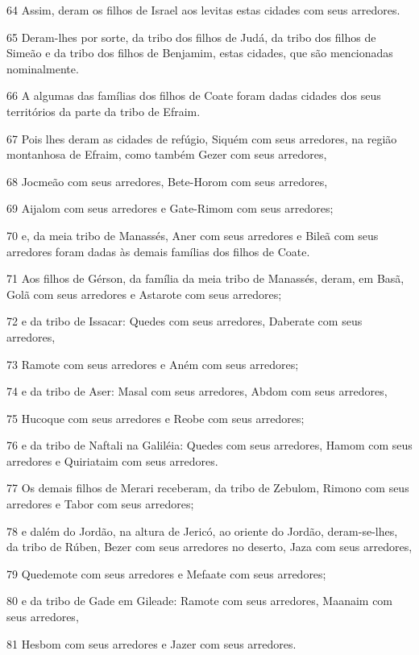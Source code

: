 \par 64 Assim, deram os filhos de Israel aos levitas estas cidades com seus arredores.
\par 65 Deram-lhes por sorte, da tribo dos filhos de Judá, da tribo dos filhos de Simeão e da tribo dos filhos de Benjamim, estas cidades, que são mencionadas nominalmente.
\par 66 A algumas das famílias dos filhos de Coate foram dadas cidades dos seus territórios da parte da tribo de Efraim.
\par 67 Pois lhes deram as cidades de refúgio, Siquém com seus arredores, na região montanhosa de Efraim, como também Gezer com seus arredores,
\par 68 Jocmeão com seus arredores, Bete-Horom com seus arredores,
\par 69 Aijalom com seus arredores e Gate-Rimom com seus arredores;
\par 70 e, da meia tribo de Manassés, Aner com seus arredores e Bileã com seus arredores foram dadas às demais famílias dos filhos de Coate.
\par 71 Aos filhos de Gérson, da família da meia tribo de Manassés, deram, em Basã, Golã com seus arredores e Astarote com seus arredores;
\par 72 e da tribo de Issacar: Quedes com seus arredores, Daberate com seus arredores,
\par 73 Ramote com seus arredores e Aném com seus arredores;
\par 74 e da tribo de Aser: Masal com seus arredores, Abdom com seus arredores,
\par 75 Hucoque com seus arredores e Reobe com seus arredores;
\par 76 e da tribo de Naftali na Galiléia: Quedes com seus arredores, Hamom com seus arredores e Quiriataim com seus arredores.
\par 77 Os demais filhos de Merari receberam, da tribo de Zebulom, Rimono com seus arredores e Tabor com seus arredores;
\par 78 e dalém do Jordão, na altura de Jericó, ao oriente do Jordão, deram-se-lhes, da tribo de Rúben, Bezer com seus arredores no deserto, Jaza com seus arredores,
\par 79 Quedemote com seus arredores e Mefaate com seus arredores;
\par 80 e da tribo de Gade em Gileade: Ramote com seus arredores, Maanaim com seus arredores,
\par 81 Hesbom com seus arredores e Jazer com seus arredores.

